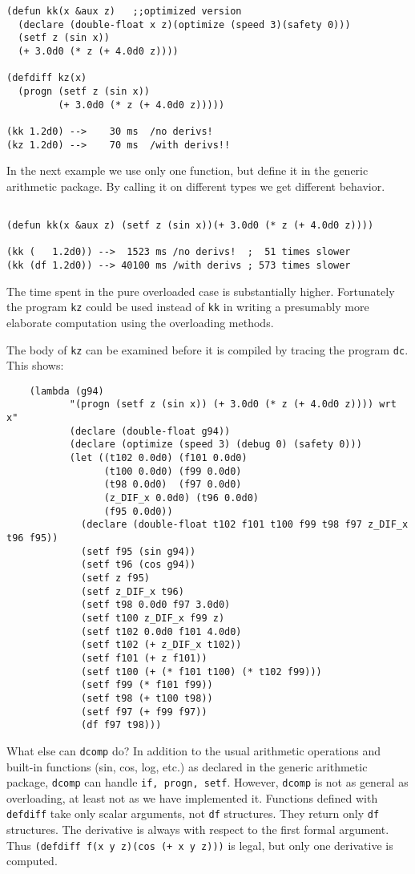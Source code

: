 \documentclass{article}
\begin{document}
{{{\begin{verbatim}
(defun kk(x &aux z)   ;;optimized version
  (declare (double-float x z)(optimize (speed 3)(safety 0)))
  (setf z (sin x))
  (+ 3.0d0 (* z (+ 4.0d0 z))))

(defdiff kz(x)
  (progn (setf z (sin x))
         (+ 3.0d0 (* z (+ 4.0d0 z)))))

(kk 1.2d0) -->    30 ms  /no derivs!
(kz 1.2d0) -->    70 ms  /with derivs!!
\end{verbatim}
In the next example we use only one function,  but define
it in the generic arithmetic package. By calling it on 
different types we get different behavior.
\begin{verbatim}

(defun kk(x &aux z) (setf z (sin x))(+ 3.0d0 (* z (+ 4.0d0 z))))

(kk (   1.2d0)) -->  1523 ms /no derivs!  ;  51 times slower
(kk (df 1.2d0)) --> 40100 ms /with derivs ; 573 times slower

\end{verbatim}
The time spent in the pure overloaded case is substantially higher.
Fortunately the program {\tt kz} could be used instead
of {\tt kk} in writing a presumably more elaborate
computation using the overloading methods.

The body of {\tt kz} can be examined before it is compiled
by tracing the program {\tt dc}. This shows:
\begin{verbatim}
    (lambda (g94)
           "(progn (setf z (sin x)) (+ 3.0d0 (* z (+ 4.0d0 z)))) wrt x"
           (declare (double-float g94))
           (declare (optimize (speed 3) (debug 0) (safety 0)))
           (let ((t102 0.0d0) (f101 0.0d0)
                 (t100 0.0d0) (f99 0.0d0)
                 (t98 0.0d0)  (f97 0.0d0)
                 (z_DIF_x 0.0d0) (t96 0.0d0)
                 (f95 0.0d0))
             (declare (double-float t102 f101 t100 f99 t98 f97 z_DIF_x t96 f95))
             (setf f95 (sin g94))
             (setf t96 (cos g94))
             (setf z f95)
             (setf z_DIF_x t96)
             (setf t98 0.0d0 f97 3.0d0)
             (setf t100 z_DIF_x f99 z)
             (setf t102 0.0d0 f101 4.0d0)
             (setf t102 (+ z_DIF_x t102))
             (setf f101 (+ z f101))
             (setf t100 (+ (* f101 t100) (* t102 f99)))
             (setf f99 (* f101 f99))
             (setf t98 (+ t100 t98))
             (setf f97 (+ f99 f97))
             (df f97 t98))) 
\end{verbatim}
What else can {\tt dcomp} do?  In addition to the usual arithmetic operations
and built-in functions (sin, cos, log, etc.) as declared in the generic arithmetic
package, 
{\tt dcomp} can handle {\tt if, progn, setf}. However,
{\tt dcomp} is not as general as overloading, at least not
as we have implemented it. Functions defined with {\tt defdiff}
take only scalar arguments, not {\tt df} structures. They return only
{\tt df} structures. The derivative is always with respect to the first formal
argument.  Thus {\tt (defdiff f(x y z)(cos (+ x y z)))} is legal, but only
one derivative is computed.

}}}
\end{document}
